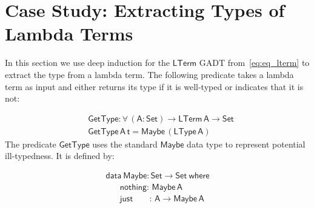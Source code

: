 \documentclass[9pt]{entcs}
\begin{document}
\section{Case Study: Extracting Types of Lambda Terms}\label{sec:app}

In this section we use deep induction for the $\mathsf{LTerm}$ GADT
from~\eqref{eq:eq_lterm} to extract the type from a lambda term.  The
following predicate takes a lambda term as input and either returns
its type if it is well-typed or indicates that it is not:

\vspace*{-0.3in}

\begin{align*}
  &\mathsf{GetType : \forall \, (A : Set) \to LTerm\,A \to Set} \\
  &\mathsf{GetType \,A \,t = Maybe \, (LType \, A)}
\end{align*}
The predicate $\mathsf{GetType}$ uses the standard $\mathsf{Maybe}$
data type to represent potential ill-typedness. It is defined by:

\vspace*{-0.1in}

\begin{equation}\label{eq:maybe}
\begin{array}{l}
\mathsf{data\ Maybe : Set \to Set\ where}\\
\mathsf{\;\;\;\;\;\;nothing :\, Maybe\,A}\\
\mathsf{\;\;\;\;\;\;just\;\;\;\;\;\;\; :\, A \to Maybe\,A}
\end{array}
\end{equation}
\end{document}
